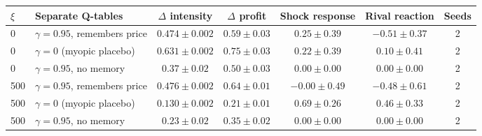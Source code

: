 \begin{tabular}{llccccc}
\toprule
$\xi$ & Separate Q-tables & $\Delta$ intensity & $\Delta$ profit & Shock response & Rival reaction & Seeds \\
\midrule
0 & $\gamma=0.95$, remembers price & $0.474 \pm 0.002$ & $0.59 \pm 0.03$ & $0.25 \pm 0.39$ & $-0.51 \pm 0.37$ & 2 \\
0 & $\gamma=0$ (myopic placebo) & $0.631 \pm 0.002$ & $0.75 \pm 0.03$ & $0.22 \pm 0.39$ & $0.10 \pm 0.41$ & 2 \\
0 & $\gamma=0.95$, no memory & $0.37 \pm 0.02$ & $0.50 \pm 0.03$ & $0.00 \pm 0.00$ & $0.00 \pm 0.00$ & 2 \\
500 & $\gamma=0.95$, remembers price & $0.476 \pm 0.002$ & $0.64 \pm 0.01$ & $-0.00 \pm 0.49$ & $-0.48 \pm 0.61$ & 2 \\
500 & $\gamma=0$ (myopic placebo) & $0.130 \pm 0.002$ & $0.21 \pm 0.01$ & $0.69 \pm 0.26$ & $0.46 \pm 0.33$ & 2 \\
500 & $\gamma=0.95$, no memory & $0.23 \pm 0.02$ & $0.35 \pm 0.02$ & $0.00 \pm 0.00$ & $0.00 \pm 0.00$ & 2 \\
\bottomrule
\end{tabular}